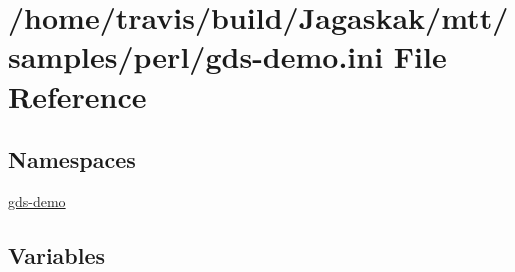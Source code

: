\hypertarget{gds-demo_8ini}{\section{/home/travis/build/\-Jagaskak/mtt/samples/perl/gds-\/demo.ini File Reference}
\label{gds-demo_8ini}
}
\subsection*{Namespaces}
\begin{DoxyCompactItemize}
\item 
\hyperlink{namespacegds-demo}{gds-\/demo}
\end{DoxyCompactItemize}
\subsection*{Variables}
